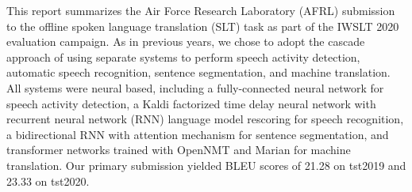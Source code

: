 This report summarizes the Air Force Research Laboratory (AFRL) submission to the offline spoken language translation (SLT) task as part of the IWSLT 2020 evaluation campaign. As in previous years, we chose to adopt the cascade approach of using separate systems to perform speech activity detection, automatic speech recognition, sentence segmentation, and machine translation. All systems were neural based, including a fully-connected neural network for speech activity detection, a Kaldi factorized time delay neural network with recurrent neural network (RNN) language model rescoring for speech recognition, a bidirectional RNN with attention mechanism for sentence segmentation, and transformer networks trained with OpenNMT and Marian for machine translation. Our primary submission yielded BLEU scores of 21.28 on tst2019 and 23.33 on tst2020.
